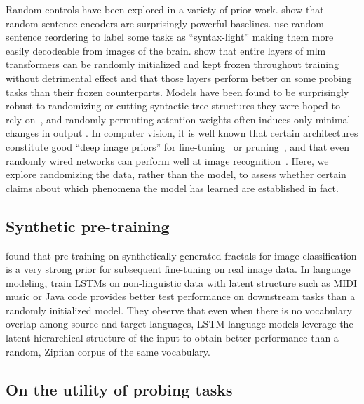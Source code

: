 \documentclass[letterpaper, 12pt]{report}
\begin{document}
Random controls have been explored in a variety of prior work.
\citet{wietingkiela2019} show that random sentence encoders are surprisingly powerful baselines.  \citet{gauthier-levy-2019-linking} use random sentence reordering to label some tasks as ``syntax-light'' making them more easily decodeable from images of the brain.
\citet{shen2020a} show that entire layers of \acrshort{mlm} transformers can be randomly initialized and kept frozen throughout training without detrimental effect and that those layers perform better on some probing tasks than their frozen counterparts.
Models have been found to be surprisingly robust to randomizing or cutting syntactic tree structures they were hoped to rely on~\cite{scheible2013cutting,williams2018latent}, and randomly permuting attention weights often induces only minimal changes in output \cite{jain-wallace-2019-attention}. In computer vision, it is well known that certain architectures constitute good ``deep image priors'' for fine-tuning~\cite{ulyanov2018deep} or pruning~\cite{frankle2020training}, and that even randomly wired networks can perform well at image recognition~\cite{xie2019exploring}. Here, we explore randomizing the data, rather than the model, to assess whether certain claims about which phenomena the model has learned are established in fact.


\subsection{Synthetic pre-training}

\citet{kataoka2021} found that pre-training on synthetically generated fractals for image classification is a very strong prior for subsequent fine-tuning on real image data. In language modeling, \citet{papadimitriou-jurafsky-2020-learning} train LSTMs \citep{hochreiter1997long} on non-linguistic data with latent structure such as MIDI music or Java code provides better test performance on downstream tasks than a randomly initialized model. They observe that even when there is no vocabulary overlap among source and target languages, LSTM language models leverage the latent hierarchical structure of the input to obtain better performance than a random, Zipfian corpus of the same vocabulary.


\subsection{On the utility of probing tasks}
\end{document}
